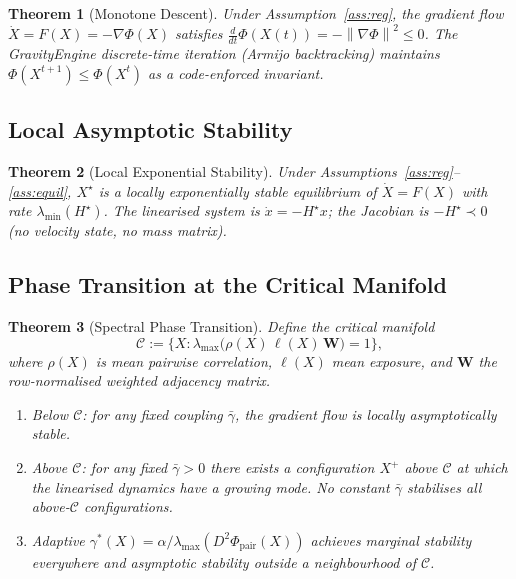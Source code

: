 \documentclass[11pt]{article}
\newtheorem{theorem}{Theorem}[section]
\theoremstyle{definition}
\newcommand{\Xst}{X^{\star}}
\newcommand{\grad}{\nabla}
\newcommand{\Cman}{\mathcal{C}}
\newcommand{\lmax}{\lambda_{\max}}
\newcommand{\lmin}{\lambda_{\min}}
\newcommand{\norm}[1]{\left\|#1\right\|}
\newcommand{\ddt}{\tfrac{d}{dt}}
\begin{document}
\begin{theorem}[Monotone Descent]
\label{thm:descent}
Under Assumption~\ref{ass:reg}, the gradient flow $\dot{X} = F(X) = -\grad\Phi(X)$
satisfies $\ddt\Phi(X(t)) = -\norm{\grad\Phi}^2 \le 0$.  The GravityEngine
discrete-time iteration (Armijo backtracking) maintains $\Phi(X^{t+1})\le\Phi(X^t)$
as a code-enforced invariant.
\end{theorem}


\subsection{Local Asymptotic Stability}

\begin{theorem}[Local Exponential Stability]
\label{thm:las}
Under Assumptions~\ref{ass:reg}--\ref{ass:equil}, $\Xst$ is a locally exponentially
stable equilibrium of $\dot{X} = F(X)$ with rate $\lmin(H^\star)$.
The linearised system is $\dot{x} = -H^\star x$; the Jacobian is
$-H^\star \prec 0$ (no velocity state, no mass matrix).
\end{theorem}


\subsection{Phase Transition at the Critical Manifold}

\begin{theorem}[Spectral Phase Transition]
\label{thm:phase}
Define the critical manifold
\[
  \Cman := \bigl\{X : \lmax\bigl(\rho(X)\,\ell(X)\,\mathbf{W}\bigr) = 1\bigr\},
\]
where $\rho(X)$ is mean pairwise correlation, $\ell(X)$ mean exposure, and
$\mathbf{W}$ the row-normalised weighted adjacency matrix.
\begin{enumerate}
\item[(\textup{i})] Below $\Cman$: for any fixed coupling $\bar\gamma$,
  the gradient flow is locally asymptotically stable.
\item[(\textup{ii})] Above $\Cman$: for any fixed $\bar\gamma > 0$ there exists
  a configuration $X^+$ above $\Cman$ at which the linearised dynamics have a
  growing mode.  No constant $\bar\gamma$ stabilises all above-$\Cman$ configurations.
\item[(\textup{iii})] Adaptive $\gamma^*(X) = \alpha/\lmax(D^2\Phi_{\mathrm{pair}}(X))$
  achieves marginal stability everywhere and asymptotic stability outside a
  neighbourhood of $\Cman$.
\end{enumerate}
\end{theorem}
\end{document}
